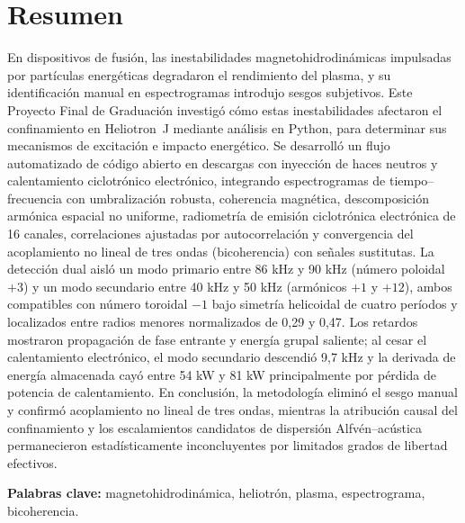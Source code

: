 \documentclass[12pt]{article}
\begin{document}
\clearpage
{}
{}
\thispagestyle{plain}

\section*{Resumen}
En dispositivos de fusión, las inestabilidades magnetohidrodinámicas impulsadas por partículas energéticas degradaron el rendimiento del plasma, y su identificación manual en espectrogramas introdujo sesgos subjetivos. Este Proyecto Final de Graduación investigó cómo estas inestabilidades afectaron el confinamiento en Heliotron~J mediante análisis en Python, para determinar sus mecanismos de excitación e impacto energético. Se desarrolló un flujo automatizado de código abierto en descargas con inyección de haces neutros y calentamiento ciclotrónico electrónico, integrando espectrogramas de tiempo--frecuencia con umbralización robusta, coherencia magnética, descomposición armónica espacial no uniforme, radiometría de emisión ciclotrónica electrónica de 16 canales, correlaciones ajustadas por autocorrelación y convergencia del acoplamiento no lineal de tres ondas (bicoherencia) con señales sustitutas. La detección dual aisló un modo primario entre 86 kHz y 90 kHz (número poloidal $+3$) y un modo secundario entre 40 kHz y 50 kHz (armónicos $+1$ y $+12$), ambos compatibles con número toroidal $-1$ bajo simetría helicoidal de cuatro períodos y localizados entre radios menores normalizados de 0,29 y 0,47. Los retardos mostraron propagación de fase entrante y energía grupal saliente; al cesar el calentamiento electrónico, el modo secundario descendió 9,7 kHz y la derivada de energía almacenada cayó entre 54 kW y 81 kW principalmente por pérdida de potencia de calentamiento. En conclusión, la metodología eliminó el sesgo manual y confirmó acoplamiento no lineal de tres ondas, mientras la atribución causal del confinamiento y los escalamientos candidatos de dispersión Alfvén--acústica permanecieron estadísticamente inconcluyentes por limitados grados de libertad efectivos.

\noindent\textbf{Palabras clave:} magnetohidrodinámica, heliotrón, plasma, espectrograma, bicoherencia.

\clearpage
{}
{}
\thispagestyle{plain}
\end{document}
